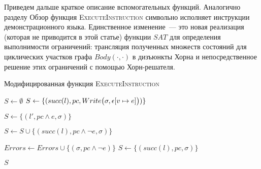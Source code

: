 Приведем дальше краткое описание вспомогательных функций.
Аналогично разделу Обзор функция \textsc{ExecuteInstruction} символьно исполняет инструкции демонстрационного языка. Единственное изменение~--- это новая реализация (которая не приводится в этой статье) функции $SAT$ для определения выполнимости ограничений: трансляция полученных множеств состояний для циклических участков графа $Body(\cdot,\cdot)$ в дизъюнкты Хорна и непосредственное решение этих ограничений с помощью Хорн-решателя.

\begin{algorithm}[H]
    \caption{Модифицированная функция \textsc{ExecuteInstruction}} \label{new_execute_instruction}
\begin{algorithmic}[1]
        \State $S \gets \emptyset$
         \label{alg:execute_instruction_start}
                \State $S \gets \{(succ(l),pc, Write\big(\sigma,\epsilon[v\mapsto e]\big))\}$
            \EndCase

                 \label{alg:sat1}
                    \State $S \gets \{(l', pc \land e, \sigma)\}$
                \EndIf

                 \label{alg:sat2}
                    \State $S \gets S \cup \{(succ(l), pc \land \neg e, \sigma)\}$
                \EndIf
            \EndCase

                 \label{alg:sat3}
                    \State $Errors \gets Errors \cup \{(\sigma, pc \land \neg e)\}$
                \Else
                    \State $S \gets \{(succ(l),pc,\sigma)\}$
                \EndIf
            \EndCase

            \EndCase
        \EndSwitch \label{alg:execute_instruction_end}
        \State \Return $S$
    \EndProcedure
\end{algorithmic}
\end{algorithm}

